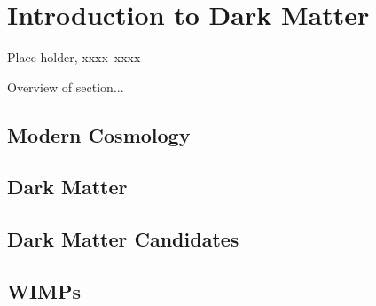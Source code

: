 \chapter{Introduction to Dark Matter}
\label{chap:SomeStuff}


%
{Place holder, xxxx--xxxx}%

Overview of section...

\section{Modern Cosmology}
\label{sec:moderncosmology}


\section{Dark Matter}
\label{sec:darkmatter}


\section{Dark Matter Candidates}
\label{sec:candidates}

\section{WIMPs}
\label{sec:candidates}